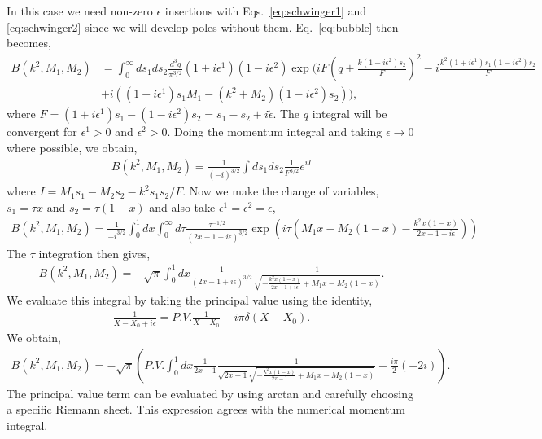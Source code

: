 \documentclass[twoside]{article}
\begin{document}
In this case we need non-zero $\epsilon$ insertions with Eqs.~\eqref{eq:schwinger1} and \eqref{eq:schwinger2} since we will develop poles without them. Eq.~\eqref{eq:bubble} then becomes,
\begin{align}
 B(k^2, M_1, M_2) &= \int_0^\infty ds_1 ds_2\frac{d^3q}{\pi^{3/2}}(1 + i\epsilon^1)(1 - i\epsilon^2)\exp\Big( iF\left( q + \frac{k(1 - i\epsilon^2)s_2}{F} \right)^2 - i\frac{k^2(1+i\epsilon^1) s_1 (1-i\epsilon^2) s_2}{F} \nonumber \\
&+ i\left( (1 + i\epsilon^1)s_1 M_1 - (k^2 + M_2)(1 - i\epsilon^2)s_2 \right) \Big),
\end{align}
where $F = (1 + i\epsilon^1)s_1 - (1-i\epsilon^2)s_2 = s_1 - s_2 + i \tilde{\epsilon}$. The $q$ integral will be convergent for $\epsilon^1 > 0$ and $\epsilon^2 > 0$. Doing the momentum integral and taking $\epsilon \rightarrow 0$ where possible, we obtain,
\begin{align}
  B(k^2, M_1,M_2) = \frac{1}{(-i)^{3/2}}\int ds_1ds_2\frac{1}{F^{3/2}}e^{iI}
\end{align}
where $I = M_1 s_1 - M_2 s_2 - k^2 s_1s_2/F$. Now we make the
change of variables, $s_1 = \tau x$ and $s_2 = \tau(1-x)$ and also take $\epsilon^1 = \epsilon^2 = \epsilon$,
\begin{align}
  B(k^2,M_1,M_2) = \frac{1}{-i^{3/2}}\int^1_0dx\int^{\infty}_0d\tau \frac{\tau^{-1/2}}{(2x-1 + i\epsilon)^{3/2}}\exp\left( i\tau\left(
      M_1 x - M_2(1-x) - \frac{k^2x(1-x)}{2x-1 + i\epsilon}
  \right)\right)
\end{align}
The $\tau$ integration then gives,
\begin{align}
 B(k^2,M_1,M_2) =   -\sqrt{\pi}\int^1_0dx \frac{1}{(2x - 1 + i\epsilon)^{3/2}}\frac{1}{\sqrt{-\frac{k^2x(1-x)}{2x-1+ i\epsilon} + M_1x - M_2(1-x)}}.
\end{align}
We evaluate this integral by taking the principal value using the identity,
\begin{align}
  \frac{1}{X - X_0+ i\epsilon} = P.V.\frac{1}{X-X_0} - i\pi \delta(X- X_0) .
\end{align}
We obtain,
\begin{align}
 B(k^2,M_1,M_2) = -\sqrt{\pi}\left(P.V. \int^1_0dx \frac{1}{2x - 1}\frac{1}{\sqrt{2x - 1}\sqrt{-\frac{k^2x(1-x)}{2x-1} + M_1x - M_2(1-x)}} -\frac{i \pi}{2} (-2 i) \right).
\end{align}
The principal value term can be evaluated by using arctan and carefully choosing a specific Riemann sheet.
This expression agrees with the numerical momentum integral.
\end{document}
